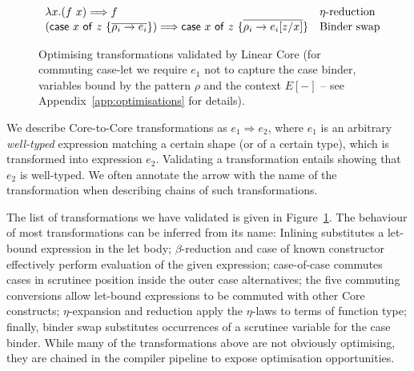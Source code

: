 \documentclass[acmsmall,review,anonymous,screen]{acmart}
\newcommand{\ccase}[2]{\mathsf{case}~#1~\mathsf{of}~#2}
\begin{document}
\begin{figure}[t]
{\[\begin{array}{ll}
      \lambda x.(f~x) \Longrightarrow f & \mbox{$\eta$-reduction}\\
      (\ccase{x}{z~\{\ov{\rho_i\to e_i}\}}) \Longrightarrow \ccase{x}{z~\{\ov{\rho_i\to  e_i[z/x]}\}}
                                                                      & \mbox{Binder swap}\\
    \end{array}
  \]}
  \caption{Optimising transformations validated by Linear
    Core\label{fig:opttrans} (for commuting case-let we
      require $e_1$ not to capture the case binder, variables bound by the
      pattern $\rho$ and the context $E[{-}]$ -- see Appendix~\ref{app:optimisations} for
    details).} 
\end{figure}





We describe Core-to-Core transformations as $e_1 \Longrightarrow e_2$,
where $e_1$ is an arbitrary \emph{well-typed} expression
matching a certain shape (or of a certain type), which is
transformed into expression $e_2$. Validating a transformation
entails showing that $e_2$ is well-typed. We often annotate the arrow
with the name of the transformation when describing chains of such
transformations.

The list of transformations we have
validated is given in Figure~\ref{fig:opttrans}.
%
The behaviour of most transformations can be inferred from its name:
Inlining substitutes a let-bound expression in the let body; $\beta$-reduction
and case of known constructor effectively perform evaluation of the given expression;
case-of-case commutes cases in scrutinee position inside the outer case alternatives;
the five commuting conversions allow let-bound expressions to be commuted with other
Core constructs; $\eta$-expansion and reduction apply the $\eta$-laws to terms of function type;
finally, binder swap substitutes occurrences of a scrutinee variable for the
case binder. While many of the transformations above are not obviously optimising,
they are chained in the compiler pipeline to expose optimisation opportunities.


\end{document}

